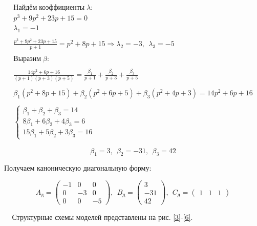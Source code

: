 \begin{par}
$$\begin{array}{l}
\textrm{Найдём}\;\textrm{коэффициенты}\;{\lambda }:\\
p^3 +9p^2 +23p+15=0\\
\lambda_1 =-1\\
\\
\frac{p^3 +9p^2 +23p+15}{p+1}=p^2 +8p+15\Rightarrow \lambda_2 =-3,~~\lambda_3 =-5\\
\\
\textrm{Выразим}\;{\beta }:\\
\\
\frac{14p^2 +6p+16}{(p+1)(p+3)(p+5)}=\frac{\beta_1 }{p+1}+\frac{\beta_2 }{p+3}+\frac{\beta_3 }{p+5}\\
\\
\beta_1 (p^2 +8p+15)+\beta_2 (p^2 +6p+5)+\beta_3 (p^2 +4p+3)=14p^2 +6p+16\\
\\
\left\lbrace \begin{array}{c}
\beta_1 +\beta_2 +\beta_3 =14\\
8\beta_1 +6\beta_2 +4\beta_3 =6\\
15\beta_1 +5\beta_2 +3\beta_3 =16
\end{array}\right.
\end{array}$$
\end{par}
\begin{par}
$$\beta_1 =3,~~\beta_2 =-31,~~\beta_3 =42$$
\end{par}

\begin{par}
\begin{flushleft}
Получаем каноническую диагональную форму:
\end{flushleft}
\end{par}

\begin{par}
$$A_д =\left(\begin{array}{ccc}
-1 & 0 & 0\\
0 & -3 & 0\\
0 & 0 & -5
\end{array}\right),~~B_д =\left(\begin{array}{c}
3\\
-31\\
42
\end{array}\right),~~C_д =\left(\begin{array}{ccc}
1 & 1 & 1
\end{array}\right)$$
\end{par}
$\ \ \ \ \ $Структурные схемы моделей представлены на рис. \ref{3}-\ref{6}.
\\


